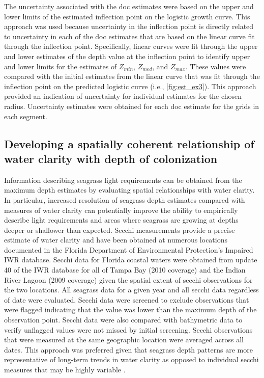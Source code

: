 \documentclass[letterpaper,12pt,oneside]{article}\usepackage[]{graphicx}\usepackage[]{color}
\begin{document}
The uncertainty associated with the \ac{doc} estimates were based on the upper and lower limits of the estimated inflection point on the logistic growth curve.  This approach was used because uncertainty in the inflection point is directly related to uncertainty in each of the \ac{doc} estimates that are based on the linear curve fit through the inflection point.   Specifically, linear curves were fit through the upper and lower estimates of the depth value at the inflection point to identify upper and lower limits for the estimates of $Z_{min}$, $Z_{med}$, and $Z_{max}$.  These values were compared with the initial estimates from the linear curve that was fit through the inflection point on the predicted logistic curve (i.e., \cref{fig:est_ex3}).  This approach provided an indication of uncertainty for individual estimates for the chosen radius.  Uncertainty estimates were obtained for each \ac{doc} estimate for the grids in each segment.

\subsection{Developing a spatially coherent relationship of water clarity with depth of colonization}

Information describing seagrass light requirements can be obtained from the maximum depth estimates by evaluating spatial relationships with water clarity.  In particular, increased resolution of seagrass depth estimates compared with measures of water clarity can potentially improve the ability to empirically describe light requirements and areas where seagrass are growing at depths deeper or shallower than expected. Secchi measurements provide a precise estimate of water clarity and have been obtained at numerous locations documented in the Florida Department of Environmental Protection's Impaired \ac{IWR} database. Secchi data for Florida coastal waters were obtained from update 40 of the \ac{IWR} database for all of Tampa Bay (2010 coverage) and the Indian River Lagoon (2009 coverage) given the spatial extent of secchi observations for the two locations.  All seagrass data for a given year and all secchi data regardless of date were evaluated.  Secchi data were screened to exclude observations that were flagged indicating that the value was lower than the maximum depth of the observation point.  Secchi data were also compared with bathymetric data to verify unflagged values were not missed by initial screening.  Secchi observations that were measured at the same geographic location were averaged across all dates.  This approach was preferred given that seagrass depth patterns are more representative of long-term trends in water clarity as opposed to individual secchi measures that may be highly variable \citep{Dennison87,Dennison93}.
\end{document}
